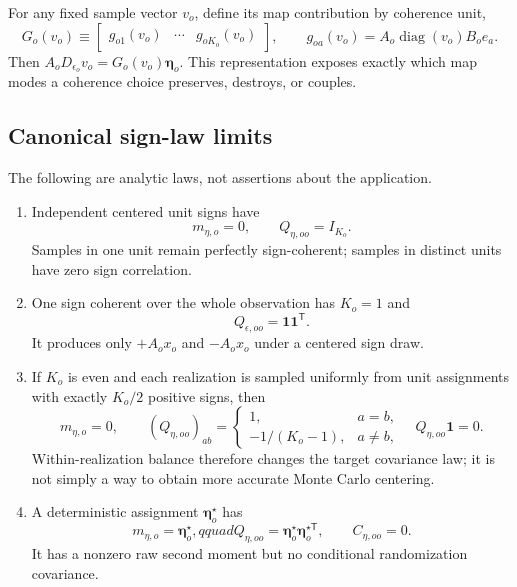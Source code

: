 \documentclass[11pt]{article}
\newcommand{\diag}{\operatorname{diag}}
\newcommand{\one}{\bm{1}}
\newcommand{\etaV}{\boldsymbol{\eta}}
\begin{document}
For any fixed sample vector $v_o$, define its map contribution by coherence
unit,
\begin{equation}
  G_o(v_o)\equiv
  \begin{bmatrix}g_{o1}(v_o)&\cdots&g_{oK_o}(v_o)\end{bmatrix},
  \qquad
  g_{oa}(v_o)=A_o\diag(v_o)B_oe_a .
  \label{eq:unit-map-contributions}
\end{equation}
Then $A_oD_{\epsilon_o}v_o=G_o(v_o)\etaV_o$.  This representation exposes
exactly which map modes a coherence choice preserves, destroys, or couples.

\subsection{Canonical sign-law limits}

The following are analytic laws, not assertions about the application.

\begin{enumerate}
\item Independent centered unit signs have
\begin{equation}
  m_{\eta,o}=0,\qquad Q_{\eta,oo}=I_{K_o}.
  \label{eq:independent-unit-law}
\end{equation}
Samples in one unit remain perfectly sign-coherent; samples in distinct units
have zero sign correlation.

\item One sign coherent over the whole observation has $K_o=1$ and
\begin{equation}
  Q_{\epsilon,oo}=\one\one^{\mathsf T}.
  \label{eq:global-coherent-law}
\end{equation}
It produces only $+A_ox_o$ and $-A_ox_o$ under a centered sign draw.

\item If $K_o$ is even and each realization is sampled uniformly from unit
assignments with exactly $K_o/2$ positive signs, then
\begin{equation}
  m_{\eta,o}=0,\qquad
  (Q_{\eta,oo})_{ab}=
  \begin{cases}
    1,&a=b,\\
    -1/(K_o-1),&a\ne b,
  \end{cases}
  \quad
  Q_{\eta,oo}\one=0.
  \label{eq:within-realization-balance}
\end{equation}
Within-realization balance therefore changes the target covariance law; it is
not simply a way to obtain more accurate Monte Carlo centering.

\item A deterministic assignment $\etaV_o^\star$ has
\begin{equation}
  m_{\eta,o}=\etaV_o^\star,qquad
  Q_{\eta,oo}=\etaV_o^\star\etaV_o^{\star\mathsf T},
  \qquad C_{\eta,oo}=0.
  \label{eq:deterministic-sign-law}
\end{equation}
It has a nonzero raw second moment but no conditional randomization covariance.
\end{enumerate}
\end{document}
